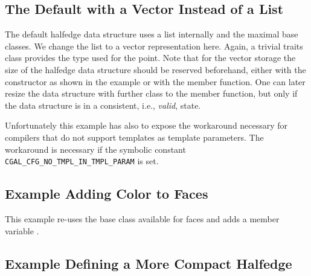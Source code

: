 

\subsection{The Default with a Vector Instead of a List}

The default halfedge data structure uses a list internally and the
maximal base classes. We change the list to a vector representation
here. Again, a trivial traits class provides the type used for the
point.  Note that for the vector storage the size of the halfedge data
structure should be reserved beforehand, either with the constructor
as shown in the example or with the  member function.
One can later resize the data structure with further class to the
 member function, but only if the data structure is 
in a consistent, i.e., {\em valid}, state.

Unfortunately this example has also to expose the workaround necessary
for compilers that do not support templates as template parameters.
The workaround is necessary if the symbolic constant
\verb|CGAL_CFG_NO_TMPL_IN_TMPL_PARAM| is set.



\subsection{Example Adding Color to Faces}

This example re-uses the base class available for faces and adds a
member variable .


\subsection{Example Defining a More Compact Halfedge}

